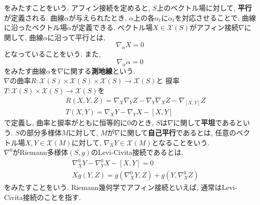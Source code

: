 \documentclass{jarticle}
\theoremstyle{definition}
\begin{document}
   をみたすことをいう. 
   アフィン接続を定めると, $S$上のベクトル場に対して, {\bf 平行}が定義される. 
   曲線$\alpha$が与えられたとき, $\alpha$上の各$\alpha_t$に$\dot{\alpha}_t$を対応させることで, 
   曲線に沿ったベクトル場$\dot{\alpha}$が定義できる. 
   ベクトル場$X\in\mathcal{X}(S)$がアフィン接続$\nabla$に関して, 曲線$\alpha$に沿って平行とは, 
   \[
   		\nabla_{\dot{\alpha}}X=0
   \]
   となっていることをいう. 
   また, 
   \[
   		\nabla_{\dot{\alpha}}\dot{\alpha}=0
   \]
   をみたす曲線$\alpha$を$\nabla$に関する{\bf 測地線}という.\\
   $\nabla$の曲率$R:\mathcal{X}(S) \times \mathcal{X}(S) \times \mathcal{X}(S) \to \mathcal{X}(S)$と
   捩率$T:\mathcal{X}(S) \times \mathcal{X}(S) \to \mathcal{X}(S)$を
   \begin{eqnarray*}
   		& & R(X,Y,Z)=\nabla_X\nabla_Y Z - \nabla_Y\nabla_X Z - \nabla_{[X,Y]}Z \\
        & & T(X,Y)=\nabla_X Y- \nabla_Y X - [X,Y] 
   \end{eqnarray*}
   で定義し, 曲率と捩率がともに恒等的に$0$のとき, $S$は$\nabla$に関して{\bf 平坦}であるという. 
   $S$の部分多様体$M$に対して, $M$が$\nabla$に関して{\bf 自己平行}であるとは, 
   任意のベクトル場$X,Y\in \mathcal{X}(M)$に対して, 
   $\nabla_X Y\in \mathcal{X}(M)$となることをいう.\\
   $\nabla^0$がRiemann多様体$(S,g)$のLevi-Civita接続であるとは, 
   \begin{eqnarray*}
   		& & \nabla^0_X Y - \nabla^0_Y X - [X,Y]=0\\
        & & Xg(Y,Z)=g(\nabla^0_X Y, Z) + g(Y,\nabla^0_X Z)
   \end{eqnarray*}
   をみたすことをいう. Riemann幾何学でアフィン接続といえば, 通常はLevi-Civita接続のことを指す.
   
\end{document}
